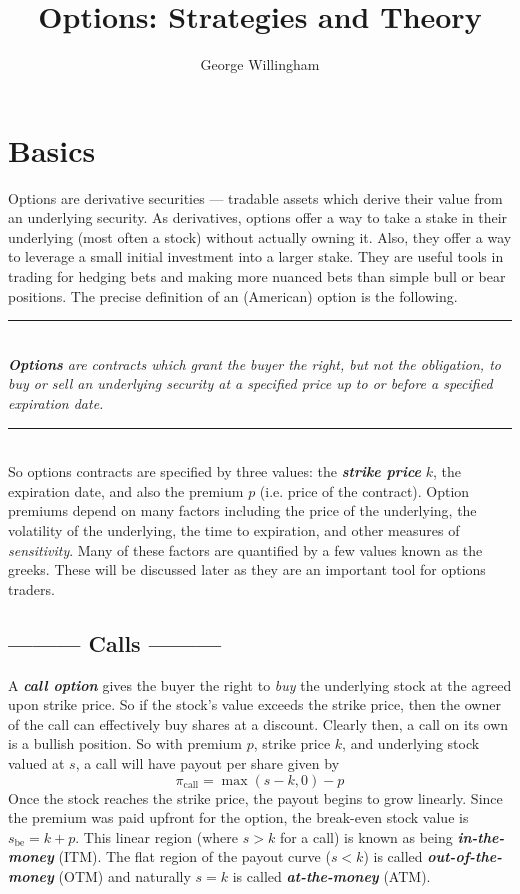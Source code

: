 \documentclass[10pt,a4paper,twocolumn]{article}
\title{Options: Strategies and Theory}
\author{George Willingham}
\date{}
\newcommand\colwidth{3.5in}
\newcommand\colline{\noindent\rule{\colwidth}{2.5pt}\\}
\newcommand\bemph[1]{\textbf{\emph{#1}}}
\newcommand\strategy[1]{{\centering\vspace{0.1in}\subsection*{ --------- #1 ---------}}}
\begin{document}
	\maketitle
	
	
	\section*{Basics}
	Options are derivative securities --- tradable assets which derive their value from an underlying security. As derivatives, options offer a way to take a stake in their underlying (most often a stock) without actually owning it. Also, they offer a way to leverage a small initial investment into a larger stake. They are useful tools in trading for hedging bets and making more nuanced bets than simple bull or bear positions. The precise definition of an (American) option is the following.
	\\
	\colline
	\emph{\textbf{Options} are contracts which grant the buyer the right, but not the obligation, to buy or sell an underlying security at a specified  price up to or before a specified expiration date.}
	\colline
	So options contracts are specified by three values: the \bemph{strike price} $k$, the expiration date, and also the premium $p$ (i.e. price of the contract). Option premiums depend on many factors including the price of the underlying, the volatility of the underlying, the time to expiration, and other measures of \emph{sensitivity}. Many of these factors are quantified by a few values known as the greeks. These will be discussed later as they are an important tool for options traders.
	
   \strategy{Calls}
	A \bemph{call option} gives the buyer the right to \emph{buy} the underlying stock at the agreed upon strike price. So if the stock's value exceeds the strike price, then the owner of the call can effectively buy shares at a discount. Clearly then, a call on its own is a bullish position. So with premium $p$, strike price $k$, and underlying stock valued at $s$, a call will have payout per share given by 
	$$ \pi_\text{call}=\max(s - k, 0) - p $$
	Once the stock reaches the strike price, the payout begins to grow linearly. Since the premium was paid upfront for the option, the break-even stock value is $s_\text{be}=k+p$. This linear region (where $s>k$ for a call) is known as being \bemph{in-the-money} (ITM). The flat region of the payout curve ($s<k$) is called \bemph{out-of-the-money} (OTM) and naturally $s=k$ is called \bemph{at-the-money} (ATM).
	
\end{document}
